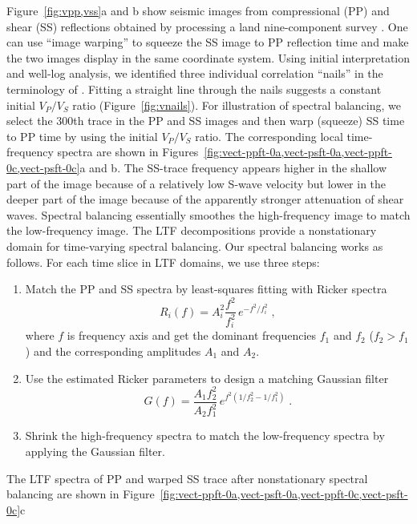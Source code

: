 Figure~\ref{fig:vpp,vss}a and b show seismic images from compressional
(PP) and shear (SS) reflections obtained by processing a land
nine-component survey \cite[]{Fomel07a}. One can use ``image warping''
\cite[]{wolberg} to squeeze the SS image to PP reflection
time and make the two images display in the same coordinate system.
Using initial interpretation and well-log analysis, we identified
three individual correlation ``nails'' in the terminology of
\cite{DeAngelo03}. Fitting a straight line through the nails suggests a 
constant initial $V_P/V_S$ ratio (Figure~\ref{fig:vnails}). For
illustration of spectral balancing, we select the 300th trace in the
PP and SS images and then warp (squeeze) SS time to PP time by using
the initial $V_P/V_S$ ratio. The corresponding local time-frequency
spectra are shown in
Figures~\ref{fig:vect-ppft-0a,vect-psft-0a,vect-ppft-0c,vect-psft-0c}a
and b. The SS-trace frequency appears higher in the shallow part of
the image because of a relatively low S-wave velocity but lower in the
deeper part of the image because of the apparently stronger
attenuation of shear waves. Spectral balancing essentially smoothes
the high-frequency image to match the low-frequency image. The LTF
decompositions provide a nonstationary domain for 
time-varying spectral balancing. Our spectral balancing works as
follows. For each time slice in LTF domains, we use three steps:
\begin{enumerate}
\item Match the PP and SS spectra by least-squares fitting 
with Ricker spectra 
\begin{equation}
\label{eq:ricker}
      R_i(f)=A^2_i\frac{f^2}{f^2_i}\,e^{-f^2/f^2_i}\;,
\end{equation}
where $f$ is frequency axis and get the dominant frequencies $f_1$ and
      $f_2$ ($f_2 > f_1$) and the corresponding amplitudes $A_1$ and
      $A_2$.
\item Use the estimated Ricker parameters to design a matching 
      Gaussian filter 
\begin{equation}
\label{eq:gauss}
G(f)=\frac{A_1 f^2_2}{A_2 f^2_1}\,e^{f^2 (1/f^2_2 -
      1/f^2_1)}\;.
\end{equation}
\item Shrink the high-frequency spectra to match the low-frequency spectra 
      by applying the Gaussian filter.
\end{enumerate}
The LTF spectra of PP and warped SS trace after nonstationary spectral
balancing are shown in
Figure~\ref{fig:vect-ppft-0a,vect-psft-0a,vect-ppft-0c,vect-psft-0c}c
